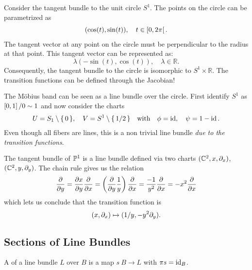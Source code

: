 \documentclass[12pt]{memoir}
\begin{document}
    \begin{Ex}
        Consider the tangent bundle to the unit circle $S^1$. The points on the circle can be parametrized as 
        \[
        (\cos(t), \sin(t)), \quad t \in \left\lbrack0, 2\pi\right\lbrack.
        \]
        The tangent vector at any point on the circle must be perpendicular to the radius at that point. This tangent vector can be represented as:
        \[
        \lambda (-\sin(t), \cos(t)), \quad \lambda \in \mathbb{R}.
        \]
        Consequently, the tangent bundle to the circle is isomorphic to $S^1 \times \mathbb{R}.$
        The transition functions can be defined through the Jacobian!
    \end{Ex}
    

    \begin{Ex}
        The M\"obius band can be seen as a line bundle over the circle. First identify $S^1$ as $\left\lbrack0,1\right\rbrack/0\sim 1$ and now consider the charts 
        $$U=S_1\setminus\{\,0\,\},\quad V=S^1\setminus\{\,1/2\,\}\quad\text{with}\quad\phi=\operatorname{id},\quad\psi=1-\operatorname{id}.$$
        Even though all fibers are lines, this is a non trivial line bundle \emph{due to the transition functions}.
    \end{Ex}

    \begin{Ex}
        The tangent bundle of $\mathbb{P}^1$ is a line bundle defined via two charts $(\mathbb{C}^2,x,\partial_x)$, $(\mathbb{C}^2,y,\partial_y)$. The chain rule gives us the relation
        $$\pdv{y}=\pdv{x}{y}\pdv{x}=\left(\pdv{y}\frac{1}{y}\right)\pdv{x}=\frac{-1}{y^2}\pdv{x}=-x^2\pdv{x}$$
        which lets us conclude that the transition function is 
        $$(x,\partial_x)\mapsto(1/y,-y^2\partial_y).$$
    \end{Ex}
    \subsection{Sections of Line Bundles}

    \begin{Def}
        A  of a line bundle $L$ over $B$ is a map $s\:B\to L$ with $\pi s=\operatorname{id}_B$. 
    \end{Def}
    
\end{document}
